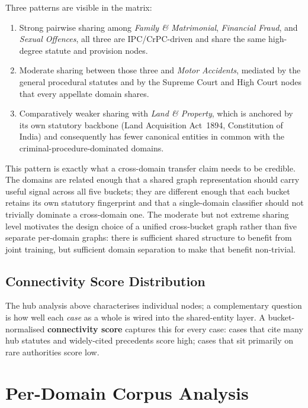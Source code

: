 Three patterns are visible in the matrix:

\begin{enumerate}
  \item Strong pairwise sharing among \emph{Family \& Matrimonial},
    \emph{Financial Fraud}, and \emph{Sexual Offences}, all three are
    IPC/CrPC-driven and share the same high-degree statute and provision nodes.
  \item Moderate sharing between those three and \emph{Motor Accidents},
    mediated by the general procedural statutes and by the Supreme Court and High
    Court nodes that every appellate domain shares.
  \item Comparatively weaker sharing with \emph{Land \& Property}, which is
    anchored by its own statutory backbone (Land Acquisition Act~1894,
    Constitution of India) and consequently has fewer canonical entities in
    common with the criminal-procedure-dominated domains.
\end{enumerate}

This pattern is exactly what a cross-domain transfer claim needs to be credible.
The domains are related enough that a shared graph representation should carry
useful signal across all five buckets; they are different enough that each bucket
retains its own statutory fingerprint and that a single-domain classifier should
not trivially dominate a cross-domain one. The moderate but not extreme sharing
level motivates the design choice of a unified cross-bucket graph rather than
five separate per-domain graphs: there is sufficient shared structure to benefit
from joint training, but sufficient domain separation to make that benefit
non-trivial.

\subsection{Connectivity Score Distribution}
\label{sec:connectivity}

The hub analysis above characterises individual nodes; a complementary
question is how well each \emph{case} as a whole is wired into the
shared-entity layer. A bucket-normalised \textbf{connectivity score}
captures this for every case: cases that cite many hub statutes and
widely-cited precedents score high; cases that sit primarily on rare
authorities score low.

\section{Per-Domain Corpus Analysis}
\label{sec:perdomain}

